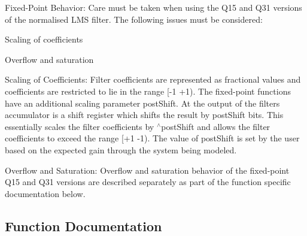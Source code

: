 \begin{DoxyParagraph}{Fixed-\/\+Point Behavior\+:}
Care must be taken when using the Q15 and Q31 versions of the normalised L\+MS filter. The following issues must be considered\+:
\begin{DoxyItemize}
\item Scaling of coefficients
\item Overflow and saturation
\end{DoxyItemize}
\end{DoxyParagraph}
\begin{DoxyParagraph}{Scaling of Coefficients\+:}
Filter coefficients are represented as fractional values and coefficients are restricted to lie in the range {\ttfamily \mbox{[}-\/1 +1)}. The fixed-\/point functions have an additional scaling parameter {\ttfamily post\+Shift}. At the output of the filter\textquotesingle{}s accumulator is a shift register which shifts the result by {\ttfamily post\+Shift} bits. This essentially scales the filter coefficients by {$^\wedge$post\+Shift} and allows the filter coefficients to exceed the range {\ttfamily \mbox{[}+1 -\/1)}. The value of {\ttfamily post\+Shift} is set by the user based on the expected gain through the system being modeled.
\end{DoxyParagraph}
\begin{DoxyParagraph}{Overflow and Saturation\+:}
Overflow and saturation behavior of the fixed-\/point Q15 and Q31 versions are described separately as part of the function specific documentation below. 
\end{DoxyParagraph}


\subsection{Function Documentation}
